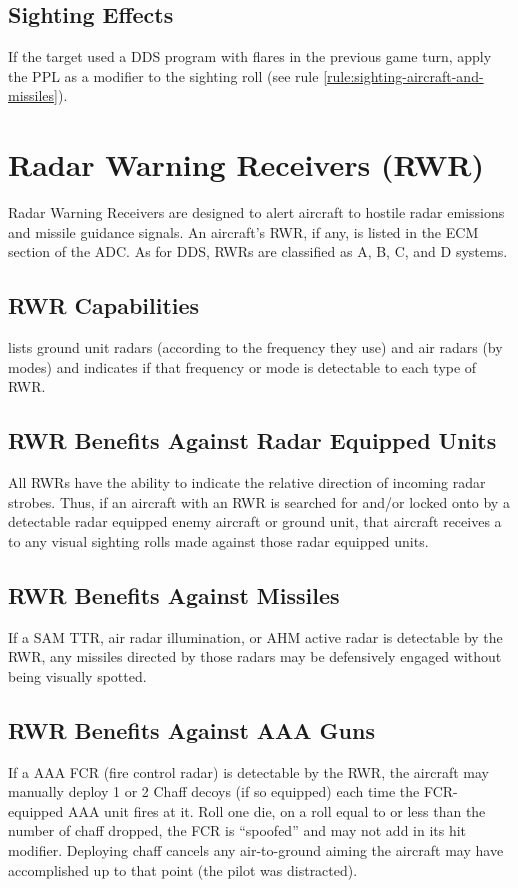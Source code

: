 \begin{advancedrules}
    \subsection{Sighting Effects} If the target used a DDS program with flares in the previous game turn, apply the PPL as a modifier to the sighting roll (see rule \ref{rule:sighting-aircraft-and-missiles}).

    \section{Radar Warning Receivers (RWR)}
    \label{rule:rwr}

    Radar Warning Receivers are designed to alert aircraft to hostile radar emissions and missile guidance signals. An aircraft's RWR, if any, is listed in the ECM section of the ADC. As for DDS, RWRs are classified as A, B, C, and D systems.

    \subsection{RWR Capabilities}  lists ground unit radars (according to the frequency they use) and air radars (by modes) and indicates if that frequency or mode is detectable to each type of RWR.

    \subsection{RWR Benefits Against Radar Equipped Units} All RWRs have the ability to indicate the relative direction of incoming radar strobes. Thus, if an aircraft with an RWR is searched for and/or locked onto by a detectable radar equipped enemy aircraft or ground unit, that aircraft receives a  to any visual sighting rolls made against those radar equipped units.

    \subsection{RWR Benefits Against Missiles} If a SAM TTR, air radar illumination, or AHM active radar is detectable by the RWR, any missiles directed by those radars may be defensively engaged without being visually spotted.

    \subsection{RWR Benefits Against AAA Guns} If a AAA FCR (fire control radar) is detectable by the RWR, the aircraft may manually deploy 1 or 2 Chaff decoys (if so equipped) each time the FCR-equipped AAA unit fires at it. Roll one die, on a roll equal to or less than the number of chaff dropped, the FCR is “spoofed” and may not add in its hit modifier. Deploying chaff cancels any air-to-ground aiming the aircraft may have accomplished up to that point (the pilot was distracted).


\end{advancedrules}
